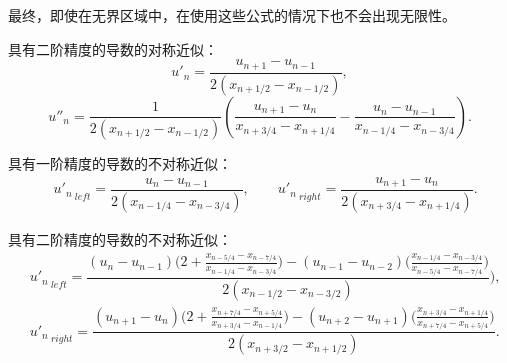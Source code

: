 \documentclass[twoside]{book}
\begin{document}
\begin{CJK*}{GBK}{song}
最终，即使在无界区域中，在使用这些公式的情况下也不会出现无限性。

具有二阶精度的导数的对称近似：
\begin{equation*}
    u'_n = \dfrac{u_{n + 1} - u_{n - 1}}{2(x_{n + 1/2} - x_{n - 1/2})},
\end{equation*}
\begin{equation*}
    u''_n = \dfrac{1}{2(x_{n + 1/2} - x_{n - 1/2})}\left(\dfrac{u_{n + 1} - u_{n}}{x_{n + 3/4} - x_{n + 1/4}} - \dfrac{u_{n} - u_{n - 1}}{x_{n - 1/4} - x_{n - 3/4}}\right).
\end{equation*}

具有一阶精度的导数的不对称近似：
\begin{align*}
    &{u'_n}_{\: left} = \dfrac{u_{n} - u_{n - 1}}{2(x_{n - 1/4} - x_{n - 3/4})}, \qquad {u'_n}_{\: right} = \dfrac{u_{n + 1} - u_{n}}{2(x_{n + 3/4} - x_{n + 1/4})}.
\end{align*}

具有二阶精度的导数的不对称近似：
{\tiny
\begin{align*}
    &{u'_n}_{\: left} = \dfrac{(u_{n} - u_{n - 1})\Big(2 + \frac{x_{n - 5/4} - x_{n - 7/4}}{x_{n - 1/4} - x_{n - 3/4}}\Big) - (u_{n - 1} - u_{n - 2})\Big(\frac{x_{n - 1/4} - x_{n - 3/4}}{x_{n - 5/4} - x_{n - 7/4}}\Big)}{2(x_{n - 1/2} - x_{n - 3/2})}),\\
    &{u'_n}_{\: right} = \dfrac{(u_{n + 1 } - u_{n})\Big(2 + \frac{x_{n + 7/4} - x_{n + 5/4}}{x_{n + 3/4} - x_{n - 1/4}}\Big) - (u_{n + 2} - u_{n + 1})\Big(\frac{x_{n + 3/4} - x_{n + 1/4}}{x_{n + 7/4} - x_{n + 5/4}}\Big)}{2(x_{n + 3/2} - x_{n + 1/2})}.
\end{align*}
}

























\end{CJK*}
\end{document}
